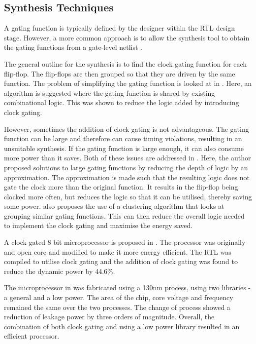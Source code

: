 \subsection{Synthesis Techniques}

A gating function is typically defined by the designer within the RTL design stage.
However, a more common approach is to allow the synthesis tool to obtain the gating functions from a gate-level netlist \cite{benini1999symbolic, hurst2008automatic}.

The general outline for the synthesis is to find the clock gating function for each flip-flop.
The flip-flops are then grouped so that they are driven by the same function. 
The problem of simplifying the gating function is looked at in \cite{han2012synthesis}. 
Here, an algorithm is suggested where the gating function is shared by existing combinational logic.
This was shown to reduce the logic added by introducing clock gating.

However, sometimes the addition of clock gating is not advantageous. 
The gating function can be large and therefore can cause timing violations, resulting in an unsuitable synthesis.
If the gating function is large enough, it can also consume more power than it saves.
Both of these issues are addressed in \cite{arbel2009resurrecting}.
Here, the author proposed solutions to large gating functions by reducing the depth of logic by an approximation. 
The approximation is made such that the resulting logic does not gate the clock more than the original function. 
It results in the flip-flop being clocked more often, but reduces the logic so that it can be utilised, thereby saving some power.
\cite{arbel2009resurrecting} also proposes the use of a clustering algorithm that looks at grouping similar gating functions. 
This can then reduce the overall logic needed to implement the clock gating and maximise the energy saved.

A clock gated 8 bit microprocessor is proposed in \cite{hoon2013energy}. 
The processor was originally and open core and modified to make it more energy efficient.
The RTL was compiled to utilise clock gating and the addition of clock gating was found to reduce the dynamic power by 44.6\%.

The microprocessor in \cite{hoon2013energy} was fabricated using a 130nm process, using two libraries - a general and a low power. 
The area of the chip, core voltage and frequency remained the same over the two processes. 
The change of process showed a reduction of leakage power by three orders of magnitude. 
Overall, the combination of both clock gating and using a low power library resulted in an efficient processor. 

